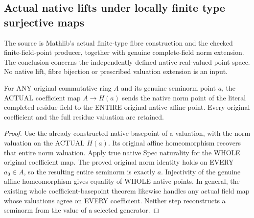 \subsection{Actual native lifts under locally finite type surjective maps}

The source is Mathlib's actual finite-type fibre construction and the checked
finite-field-point producer, together with genuine complete-field norm extension.
The conclusion concerns the independently defined native real-valued point space.
No native lift, fibre bijection or prescribed valuation extension is an input.

\begin{lemma}
\label{scheme:native-completed-residue-point-affine}
For ANY original commutative ring $A$ and its genuine seminorm point $a$,
the ACTUAL coefficient map $A\to H(a)$ sends the native norm point of the
literal completed residue field to the ENTIRE original native affine point.
Every original coefficient and the full residue valuation are retained.
\leanok
\end{lemma}
\begin{proof}
Use the already constructed native basepoint of a valuation, with the norm
valuation on the ACTUAL $H(a)$. Its original affine homeomorphism recovers
that entire norm valuation. Apply true native Spec naturality for the WHOLE
original coefficient map. The proved original norm identity holds on EVERY
$a_0\in A$, so the resulting entire seminorm is exactly $a$. Injectivity
of the genuine affine homeomorphism gives equality of WHOLE native points.
In general, the existing whole coefficient-basepoint theorem likewise handles
any actual field map whose valuations agree on EVERY coefficient. Neither
step reconstructs a seminorm from the value of a selected generator.
\end{proof}

